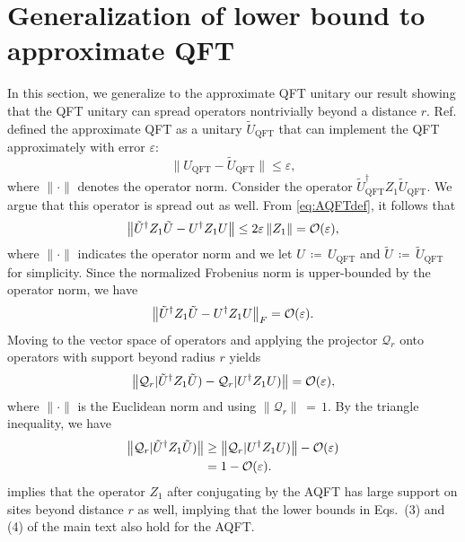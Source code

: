 \section{Generalization of lower bound to approximate QFT}
\label{sec:II}
In this section, we generalize to the approximate QFT unitary our result showing that the QFT unitary can spread operators nontrivially beyond a distance $r$.
Ref. \cite{Cleve2000} defined the approximate QFT as a unitary $\tilde{U}_\mathrm{QFT}$ that can implement the QFT approximately with error $\varepsilon$:
\begin{equation}
  \label{eq:AQFTdef}
  \|U_\mathrm{QFT}-\tilde {U}_\mathrm{QFT}\|\leq \varepsilon,
\end{equation}
where $\|\cdot\|$ denotes the operator norm.
Consider the operator $\tilde {U}_\mathrm{QFT}^\dag Z_1 \tilde {U}_\mathrm{QFT}$.
We argue that this operator is spread out as well.
From \cref{eq:AQFTdef}, it follows that
\begin{equation}
  \norm{\tilde {U}^\dag Z_1 \tilde {U} - U^\dag Z_1 U} \leq 2\varepsilon\norm{Z_1} = \O{\varepsilon},
\end{equation}
where $\| \cdot\|$ indicates the operator norm and we let $U$\,$\coloneqq$\,${U}_\mathrm{QFT}$ and $\tilde U$\,$\coloneqq$\,$\tilde {U}_\mathrm{QFT}$ for simplicity.
Since the normalized Frobenius norm is upper-bounded by the operator norm, we have
\begin{align}
\norm{\tilde {U}^\dag Z_1 \tilde {U} - U^\dag Z_1 U}_F = \O{\varepsilon}.
\end{align}
Moving to the vector space of operators and applying the projector $\mathcal{Q}_r$ onto operators with support beyond radius $r$ yields
\begin{align}
\norm{\mathcal{Q}_r |\tilde {U}^\dag Z_1 \tilde {U}) - \mathcal{Q}_r |U^\dag Z_1 U)} = \O{\varepsilon},
\end{align}
where $\|\cdot\|$ is the Euclidean norm and using $\|\mathcal{Q}_r\|$\,$=$\,$1$. By the triangle inequality, we have
\begin{align}
\label{eq:frobeniuslowerbound}
 \norm{\mathcal{Q}_r |\tilde {U}^\dag Z_1 \tilde {U})} & \geq \norm{\mathcal{Q}_r |U^\dag Z_1 U)} -\O{\varepsilon}
 \\ &= 1-\O{\varepsilon}.
\end{align}
 implies that the operator $Z_1$ after conjugating by the AQFT has large support on sites beyond distance $r$ as well, implying that the lower bounds in Eqs.~(3) and (4) of the main text
also hold for the AQFT.

